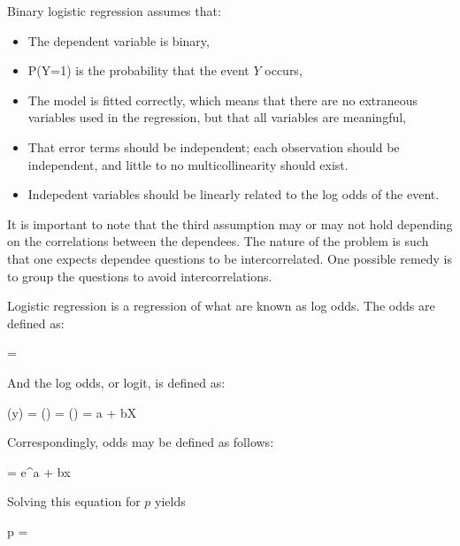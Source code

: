 Binary logistic regression assumes that:

\begin{itemize} 

 \item The dependent variable is binary,
 
 \item P(Y=1) is the probability that the event $Y$ occurs, 
 
 \item The model is fitted correctly, which means that there are no extraneous
 variables used in the regression, but that all variables are meaningful,

 \item That error terms should be independent; each observation should be
 independent, and little to no multicollinearity should exist.  

 \item Indepedent variables should be linearly related to the log odds of
 the event.

\end{itemize} 

It is important to note that the third assumption may or may not hold depending
on the correlations between the dependees.  The nature of the problem is such
that one expects dependee questions to be intercorrelated.  One possible remedy
is to group the questions to avoid intercorrelations.

Logistic regression is a regression of what are known as log odds. The odds
are defined as:

\begin{equations}
   = 
\end{equations}

And the log odds, or logit, is defined as:

\begin{equations}
  \logit(y) = \ln() = \ln\Big(\Big) = a + bX
\end{equations}

Correspondingly, odds may be defined as follows:

\begin{equations}
   = e^{a + bx}
\end{equations}

Solving this equation for $p$ yields

\begin{equations}
  p = 
\end{equations}

